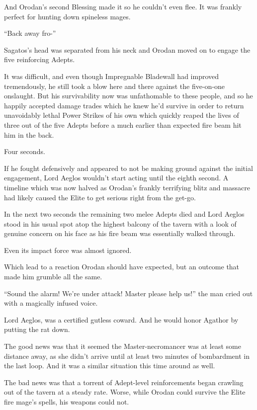 \documentclass[a4paper,10pt]{book}
\begin{document}
And Orodan’s second Blessing made it so he couldn’t even flee. It was frankly perfect for hunting down spineless mages.\par
“Back away fro-”\par
Sagatos’s head was separated from his neck and Orodan moved on to engage the five reinforcing Adepts.\par
It was difficult, and even though Impregnable Bladewall had improved tremendously, he still took a blow here and there against the five-on-one onslaught. But his survivability now was unfathomable to these people, and so he happily accepted damage trades which he knew he’d survive in order to return unavoidably lethal Power Strikes of his own which quickly reaped the lives of three out of the five Adepts before a much earlier than expected fire beam hit him in the back.\par
Four seconds.\par
If he fought defensively and appeared to not be making ground against the initial engagement, Lord Aeglos wouldn’t start acting until the eighth second. A timeline which was now halved as Orodan’s frankly terrifying blitz and massacre had likely caused the Elite to get serious right from the get-go.\par
In the next two seconds the remaining two melee Adepts died and Lord Aeglos stood in his usual spot atop the highest balcony of the tavern with a look of genuine concern on his face as his fire beam was essentially walked through.\par
Even its impact force was almost ignored.\par
Which lead to a reaction Orodan should have expected, but an outcome that made him grumble all the same.\par
“Sound the alarm! We’re under attack! Master please help us!” the man cried out with a magically infused voice.\par
Lord Aeglos, was a certified gutless coward. And he would honor Agathor by putting the rat down.\par
The good news was that it seemed the Master-necromancer was at least some distance away, as she didn’t arrive until at least two minutes of bombardment in the last loop. And it was a similar situation this time around as well.\par
The bad news was that a torrent of Adept-level reinforcements began crawling out of the tavern at a steady rate. Worse, while Orodan could survive the Elite fire mage’s spells, his weapons could not.\par
\end{document}
